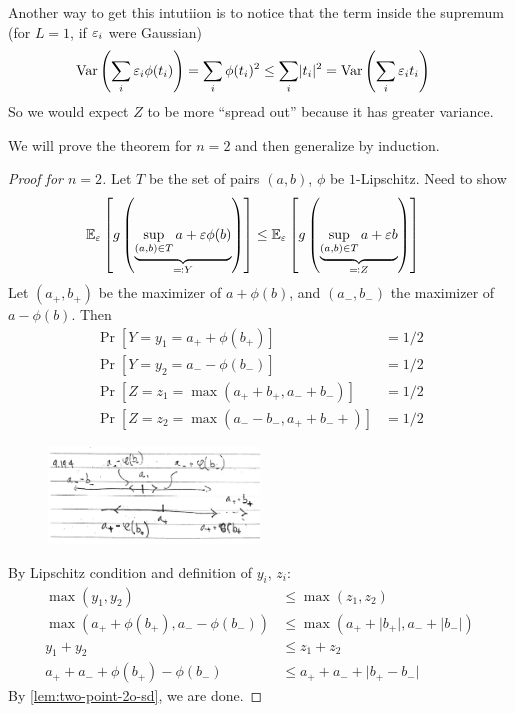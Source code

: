 Another way to get this intutiion is to notice that the term inside the
supremum (for $L = 1$, if $\varepsilon_i$ were Gaussian)
\begin{align}
  \operatorname{Var}\left(\sum_{i} \varepsilon_i \phi(t_i)\right)
  &= \sum_i \phi(t_i)^2
  \leq \sum_{i} \lvert t_i \rvert^2
  = \operatorname{Var}\left(\sum_i \varepsilon_i t_i\right)
\end{align}
So we would expect $Z$ to be more ``spread out'' because it has greater
variance.

We will prove the theorem for $n=2$ and then generalize by induction.

\begin{proof}[Proof for $n=2$]
  Let $T$ be the set of pairs $(a,b)$, $\phi$ be $1$-Lipschitz.
  Need to show
  \begin{align}
    \mathbb{E}_\varepsilon\left[
      g\left(
        \underbrace{\sup_{(a,b) \in T} a + \varepsilon \phi(b)}_{\eqqcolon Y}
      \right)
    \right]
    &\leq
    \mathbb{E}_\varepsilon\left[
      g\left(
        \underbrace{\sup_{(a,b) \in T} a + \varepsilon b}_{\eqqcolon Z}
      \right)
    \right]
  \end{align}
  Let $(a_+, b_+)$ be the maximizer of $a + \phi(b)$, and
  $(a_-, b_-)$ the maximizer of $a - \phi(b)$. Then
  \begin{align}
    \Pr[Y = y_1 = a_+ + \phi(b_+)] &= 1/2 \\
    \Pr[Y = y_2 = a_- - \phi(b_-)] &= 1/2 \\
    \Pr[Z = z_1 = \max(a_+ + b_+, a_- + b_-)] &= 1/2 \\
    \Pr[Z = z_2 = \max(a_- - b_-, a_+ + b_-+)] &= 1/2
  \end{align}

  \begin{figure}[H]
    \begin{center}
      \includegraphics[width=0.5\textwidth]{figures/9-19-4.png}
    \end{center}
  \end{figure}

  By Lipschitz condition and definition of $y_i$, $z_i$:
  \begin{align}
    \max(y_1, y_2) &\leq \max(z_1, z_2) \\
    \max(a_+ + \phi(b_+), a_- - \phi(b_-))
                   &\leq \max(a_+ + \lvert b_+ \rvert, a_- + \lvert b_- \rvert) \\
    y_1 + y_2 &\leq z_1 + z_2 \\
    a_+ + a_- + \phi(b_+) - \phi(b_-)
              &\leq a_+ + a_- + \lvert b_+ - b_- \rvert
  \end{align}
  By \cref{lem:two-point-2o-sd}, we are done.
\end{proof}

